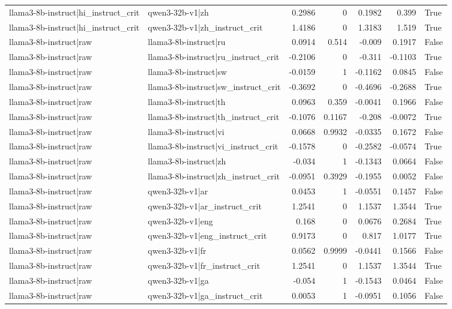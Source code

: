 \begin{table}
\begin{tabular}{l l r r r r l}
llama3-8b-instruct|hi_instruct_crit & qwen3-32b-v1|zh & 0.2986 & 0 & 0.1982 & 0.399 & True \\
llama3-8b-instruct|hi_instruct_crit & qwen3-32b-v1|zh_instruct_crit & 1.4186 & 0 & 1.3183 & 1.519 & True \\
llama3-8b-instruct|raw & llama3-8b-instruct|ru & 0.0914 & 0.514 & -0.009 & 0.1917 & False \\
llama3-8b-instruct|raw & llama3-8b-instruct|ru_instruct_crit & -0.2106 & 0 & -0.311 & -0.1103 & True \\
llama3-8b-instruct|raw & llama3-8b-instruct|sw & -0.0159 & 1 & -0.1162 & 0.0845 & False \\
llama3-8b-instruct|raw & llama3-8b-instruct|sw_instruct_crit & -0.3692 & 0 & -0.4696 & -0.2688 & True \\
llama3-8b-instruct|raw & llama3-8b-instruct|th & 0.0963 & 0.359 & -0.0041 & 0.1966 & False \\
llama3-8b-instruct|raw & llama3-8b-instruct|th_instruct_crit & -0.1076 & 0.1167 & -0.208 & -0.0072 & True \\
llama3-8b-instruct|raw & llama3-8b-instruct|vi & 0.0668 & 0.9932 & -0.0335 & 0.1672 & False \\
llama3-8b-instruct|raw & llama3-8b-instruct|vi_instruct_crit & -0.1578 & 0 & -0.2582 & -0.0574 & True \\
llama3-8b-instruct|raw & llama3-8b-instruct|zh & -0.034 & 1 & -0.1343 & 0.0664 & False \\
llama3-8b-instruct|raw & llama3-8b-instruct|zh_instruct_crit & -0.0951 & 0.3929 & -0.1955 & 0.0052 & False \\
llama3-8b-instruct|raw & qwen3-32b-v1|ar & 0.0453 & 1 & -0.0551 & 0.1457 & False \\
llama3-8b-instruct|raw & qwen3-32b-v1|ar_instruct_crit & 1.2541 & 0 & 1.1537 & 1.3544 & True \\
llama3-8b-instruct|raw & qwen3-32b-v1|eng & 0.168 & 0 & 0.0676 & 0.2684 & True \\
llama3-8b-instruct|raw & qwen3-32b-v1|eng_instruct_crit & 0.9173 & 0 & 0.817 & 1.0177 & True \\
llama3-8b-instruct|raw & qwen3-32b-v1|fr & 0.0562 & 0.9999 & -0.0441 & 0.1566 & False \\
llama3-8b-instruct|raw & qwen3-32b-v1|fr_instruct_crit & 1.2541 & 0 & 1.1537 & 1.3544 & True \\
llama3-8b-instruct|raw & qwen3-32b-v1|ga & -0.054 & 1 & -0.1543 & 0.0464 & False \\
llama3-8b-instruct|raw & qwen3-32b-v1|ga_instruct_crit & 0.0053 & 1 & -0.0951 & 0.1056 & False \\

\end{tabular}
\end{table}
